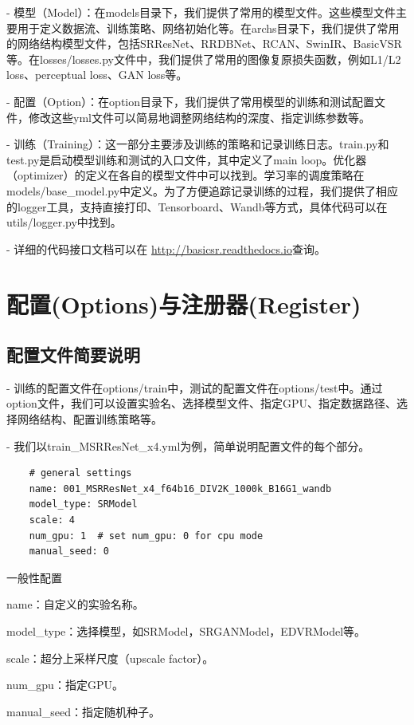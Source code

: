 \documentclass[../main.tex]{subfiles}
\begin{document}
	- 模型（Model）：在models目录下，我们提供了常用的模型文件。这些模型文件主要用于定义数据流、训练策略、网络初始化等。在archs目录下，我们提供了常用的网络结构模型文件，包括SRResNet、RRDBNet、RCAN、SwinIR、BasicVSR等。在losses/losses.py文件中，我们提供了常用的图像复原损失函数，例如L1/L2 loss、perceptual loss、GAN loss等。
	
	- 配置（Option）：在option目录下，我们提供了常用模型的训练和测试配置文件，修改这些yml文件可以简易地调整网络结构的深度、指定训练参数等。
	
	- 训练（Training）：这一部分主要涉及训练的策略和记录训练日志。train.py和test.py是启动模型训练和测试的入口文件，其中定义了main loop。优化器（optimizer）的定义在各自的模型文件中可以找到。学习率的调度策略在models/base\_model.py中定义。为了方便追踪记录训练的过程，我们提供了相应的logger工具，支持直接打印、Tensorboard、Wandb等方式，具体代码可以在utils/logger.py中找到。
	
	
	- 详细的代码接口文档可以在 \url{http://basicsr.readthedocs.io}查询。
	
	
	
	\section{配置(Options)与注册器(Register)}
	\subsection{配置文件简要说明}
	- 训练的配置文件在options/train中，测试的配置文件在options/test中。通过option文件，我们可以设置实验名、选择模型文件、指定GPU、指定数据路径、选择网络结构、配置训练策略等。
	
	- 我们以train\_MSRResNet\_x4.yml为例，简单说明配置文件的每个部分。
	
	\begin{verbatim}
    # general settings
    name: 001_MSRResNet_x4_f64b16_DIV2K_1000k_B16G1_wandb
    model_type: SRModel
    scale: 4
    num_gpu: 1  # set num_gpu: 0 for cpu mode
    manual_seed: 0
	\end{verbatim}
	\begin{exampleBox}[righthand ratio=0.00, sidebyside, sidebyside align=center, lower separated=false]{一般性配置}
	
	name：自定义的实验名称。
	
    model\_type：选择模型，如SRModel，SRGANModel，EDVRModel等。
    
    scale：超分上采样尺度（upscale factor）。
    
    num\_gpu：指定GPU。
    
    manual\_seed：指定随机种子。
    \end{exampleBox}
    
\end{document}

